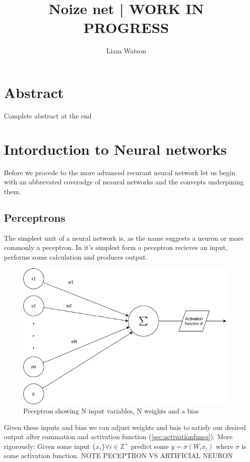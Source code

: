 \documentclass{article}
\title{Noize net | WORK IN PROGRESS}
\author{Liam Watson}
\begin{document}
\maketitle
\tableofcontents
\section{Abstract}
Complete abstract at the end
\section{Intorduction to Neural networks}
\label{sec:intro}
Before we procede to the more advanced recurant neural network let us begin with an abbrevated coveradge of neaural networks and the convepts underpining them. \cite{Nielsen}
\subsection{Perceptrons}
\label{sec:peceptrons}
The simplest unit of a neural network is, as the name suggests a neuron or more commonly a peceptron. In it's simplest form a peceptron recieves an input, performs some calculation and produces output.
\begin{figure}[H]
\caption{Peceptron showing N input variables, N weights and a bias}
\includegraphics[scale=0.5]{peceptron.png}
\end{figure}
Given these inputs and bias we can adjust weights and bais to satisfy our desired output after summation and activation function (\ref{sec:activationfuncs}). 
More rigorously: Given some input $\{x_i\} \forall i\in \mathbb{Z^+}$ predict some $y=\sigma(W_i x_i)$ where $\sigma$ is some activation function. NOTE PECEPTRON VS ARTIFICIAL NEURON
\end{document}

